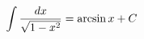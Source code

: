 \documentclass[preview]{standalone}
\begin{document}
\begin{align*}
\special{dvisvgm:raw <g id='unique000'>}\int \frac{dx}{\sqrt{1-x^2}} = \arcsin x + C\special{dvisvgm:raw </g>}
\end{align*}
\end{document}
